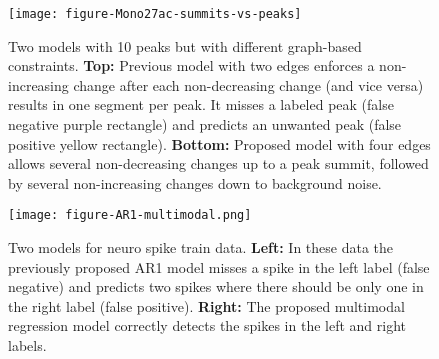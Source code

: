 \documentclass{article}
\begin{document}
\begin{figure}
  \centering
  \texttt{[image: figure-Mono27ac-summits-vs-peaks]}
  \caption{Two models with 10 peaks but with different graph-based
    constraints. \textbf{Top:} Previous model with two edges enforces
    a non-increasing change after each non-decreasing change (and vice
    versa) results in one segment per peak. It misses a labeled peak
    (false negative purple rectangle) and predicts an unwanted peak
    (false positive yellow rectangle). \textbf{Bottom:} Proposed model
    with four edges allows several non-decreasing changes up to a peak
    summit, followed by several non-increasing changes down to
    background noise.}
  \label{fig:summits-vs-peaks}
\end{figure}

\begin{figure}
  \centering
  \texttt{[image: figure-AR1-multimodal.png]}
  \caption{Two models for neuro spike train data. \textbf{Left:} In
    these data the previously proposed AR1 model misses a spike in the
    left label (false negative) and predicts two spikes where there
    should be only one in the right label (false
    positive). \textbf{Right:} The proposed multimodal regression
    model correctly detects the spikes in the left and right labels.}
  \label{fig:AR1-multimodal}
\end{figure}



\end{document}
